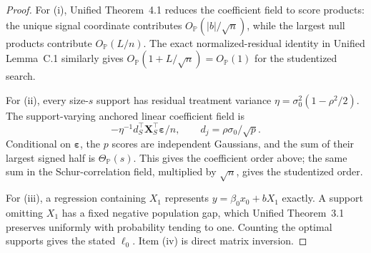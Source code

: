 \documentclass[a4paper,10pt,english]{article}
\theoremstyle{definition}
\newcommand{\Prob}{\mathbb P}
\begin{document}
\begin{proof}
For (i), Unified Theorem~4.1 reduces the coefficient field to score
products: the unique signal coordinate contributes
$O_{\Prob}(|b|/\sqrt n)$, while the largest null products contribute
$O_{\Prob}(L/n)$.  The exact normalized-residual identity in Unified
Lemma~C.1 similarly gives $O_{\Prob}(1+L/\sqrt n)=O_{\Prob}(1)$
for the studentized search.

For (ii), every size-$s$ support has residual treatment variance
$\eta=\sigma_0^2(1-\rho^2/2)$.  The support-varying anchored linear
coefficient field is
\[
 -\eta^{-1}d_S^\top\mathbf X_S^\top
 \boldsymbol\varepsilon/n,
 \qquad d_j=\rho\sigma_0/\sqrt p.
\]
Conditional on $\boldsymbol\varepsilon$, the $p$ scores are independent
Gaussians, and the sum of their largest signed half is
$\Theta_{\Prob}(s)$.  This gives the coefficient order above; the same
sum in the Schur-correlation field, multiplied by $\sqrt n$, gives the
studentized order.

For (iii), a regression containing $X_1$ represents
$y=\beta_0x_0+bX_1$ exactly.  A support omitting $X_1$ has a fixed
negative population gap, which Unified Theorem~3.1 preserves uniformly
with probability tending to one.  Counting the optimal supports gives
the stated $\ell_0$.  Item (iv) is direct matrix inversion.
\end{proof}
\end{document}
